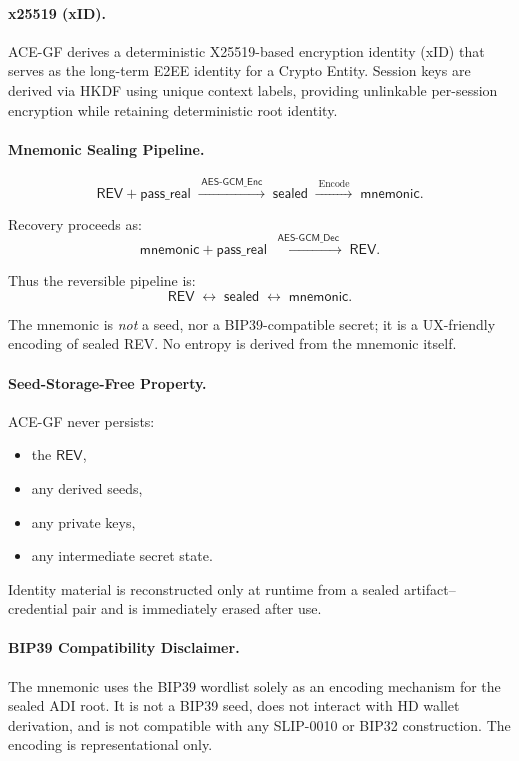 \documentclass[12pt,a4paper]{article}
\begin{document}
  \paragraph{x25519 (xID).}
  ACE-GF derives a deterministic X25519-based encryption identity (xID)
  that serves as the long-term E2EE identity for a Crypto Entity.
  Session keys are derived via HKDF using unique context labels, providing
  unlinkable per-session encryption while retaining deterministic root identity.

  \paragraph{Mnemonic Sealing Pipeline.}
  \[
   \mathsf{REV} + \mathsf{pass\_real}
   \;\xrightarrow{\;\mathsf{AES\text{-}GCM\_Enc}\;}\;
   \mathsf{sealed}
   \;\xrightarrow{\;\text{Encode}\;}\;
   \mathsf{mnemonic}.
  \]

  Recovery proceeds as:
  \[
   \mathsf{mnemonic} + \mathsf{pass\_real}
   \;\xrightarrow{\;\mathsf{AES\text{-}GCM\_Dec}\;}\;
   \mathsf{REV}.
  \]

  Thus the reversible pipeline is:
  \[
   \mathsf{REV} \;\longleftrightarrow\; \mathsf{sealed} \;\longleftrightarrow\; \mathsf{mnemonic}.
  \]

  The mnemonic is \emph{not} a seed, nor a BIP39-compatible secret; it is a
  UX-friendly encoding of sealed REV. No entropy is derived from the mnemonic
  itself.

  \paragraph{Seed-Storage-Free Property.}
  ACE-GF never persists:
  \begin{itemize}
   \item the $\mathsf{REV}$,
   \item any derived seeds,
   \item any private keys,
   \item any intermediate secret state.
  \end{itemize}

  Identity material is reconstructed only at runtime from a sealed artifact–credential pair and is immediately erased after use.

  \paragraph*{BIP39 Compatibility Disclaimer.}
  The mnemonic uses the BIP39 wordlist solely as an encoding mechanism for
  the sealed ADI root. It is not a BIP39 seed, does not interact with HD
  wallet derivation, and is not compatible with any SLIP-0010 or BIP32
  construction. The encoding is representational only.
\end{document}

